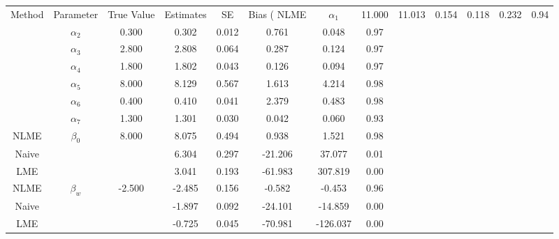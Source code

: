 \begin{table}[ht]
\centering
\begin{tabular}{cccccccc}
  \hline
Method & Parameter & True Value & Estimates & SE & Bias (%
  \hline
NLME & $\alpha_1$ & 11.000 & 11.013 & 0.154 & 0.118 & 0.232 & 0.94 \\ 
   & $\alpha_2$ & 0.300 & 0.302 & 0.012 & 0.761 & 0.048 & 0.97 \\ 
   & $\alpha_3$ & 2.800 & 2.808 & 0.064 & 0.287 & 0.124 & 0.97 \\ 
   & $\alpha_4$ & 1.800 & 1.802 & 0.043 & 0.126 & 0.094 & 0.97 \\ 
   & $\alpha_5$ & 8.000 & 8.129 & 0.567 & 1.613 & 4.214 & 0.98 \\ 
   & $\alpha_6$ & 0.400 & 0.410 & 0.041 & 2.379 & 0.483 & 0.98 \\ 
   & $\alpha_7$ & 1.300 & 1.301 & 0.030 & 0.042 & 0.060 & 0.93 \\ 
   \hline
NLME & $\beta_0$ & 8.000 & 8.075 & 0.494 & 0.938 & 1.521 & 0.98 \\ 
  Naive &  &  & 6.304 & 0.297 & -21.206 & 37.077 & 0.01 \\ 
  LME &  &  & 3.041 & 0.193 & -61.983 & 307.819 & 0.00 \\ 
  NLME & $\beta_w$ & -2.500 & -2.485 & 0.156 & -0.582 & -0.453 & 0.96 \\ 
  Naive &  &  & -1.897 & 0.092 & -24.101 & -14.859 & 0.00 \\ 
  LME &  &  & -0.725 & 0.045 & -70.981 & -126.037 & 0.00 \\ 
  \end{tabular}
\end{table}
